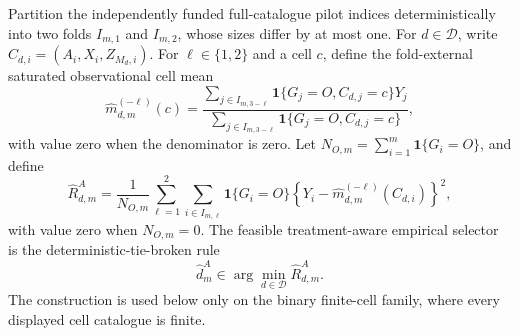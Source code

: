 Partition the independently funded full-catalogue pilot indices deterministically into two folds \(I_{m,1}\) and \(I_{m,2}\), whose sizes differ by at most one.  For \(d\in\mathcal D\), write \(C_{d,i}=(A_i,X_i,Z_{M_d,i})\).  For \(\ell\in\{1,2\}\) and a cell \(c\), define the fold-external saturated observational cell mean
\[
 \widehat m_{d,m}^{(-\ell)}(c)=
 \frac{\sum_{j\in I_{m,3-\ell}}\mathbf 1\{G_j=O,C_{d,j}=c\}Y_j}
 {\sum_{j\in I_{m,3-\ell}}\mathbf 1\{G_j=O,C_{d,j}=c\}},
\]
with value zero when the denominator is zero.  Let \(N_{O,m}=\sum_{i=1}^m\mathbf1\{G_i=O\}\), and define
\[
 \widehat R_{d,m}^A=
 \frac1{N_{O,m}}\sum_{\ell=1}^2\sum_{i\in I_{m,\ell}}
 \mathbf1\{G_i=O\}
 \left\{Y_i-\widehat m_{d,m}^{(-\ell)}(C_{d,i})\right\}^2,
\]
with value zero when \(N_{O,m}=0\).  The feasible treatment-aware empirical selector is the deterministic-tie-broken rule
\[
 \widehat d_m^A\in\arg\min_{d\in\mathcal D}\widehat R_{d,m}^A.
\]
The construction is used below only on the binary finite-cell family, where every displayed cell catalogue is finite.